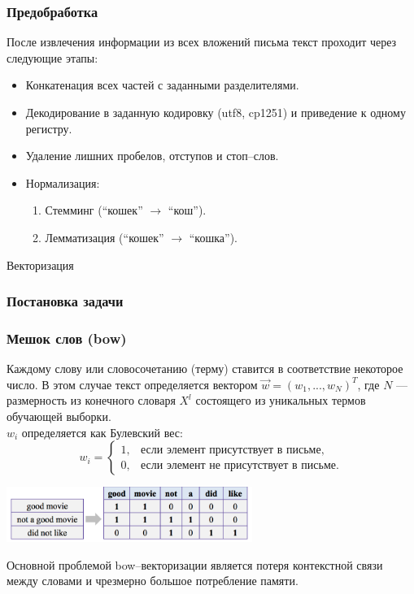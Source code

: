 \documentclass[compress,professionalfont]{beamer}
\begin{document}
\begin{frame}
\frametitle{Предобработка}

После извлечения информации из всех вложений письма текст проходит через следующие этапы:
\begin{itemize}
\item Конкатенация всех частей с заданными разделителями.
\item Декодирование в заданную кодировку (utf8, cp1251) и приведение к одному регистру.
\item Удаление лишних пробелов, отступов и стоп--слов.
\item Нормализация:
\begin{enumerate}
\item Стемминг (``кошек'' $\rightarrow$ ``кош'').
\item Лемматизация (``кошек'' $\rightarrow$ ``кошка'').
\end{enumerate}
\end{itemize}

\end{frame}

\begin{frame}

\begin{center}
Векторизация
\end{center}

\end{frame}

\begin{frame}
\frametitle{Постановка задачи}

\end{frame}

\begin{frame}
\frametitle{Мешок слов (bow)}

Каждому слову или словосочетанию (терму) ставится в соответствие некоторое число. В этом случае текст определяется вектором $\vec{w} = (w_1, ..., w_N)^T$,
где $N$ --- размерность из конечного словаря $X^l$ состоящего из уникальных термов обучающей выборки. \\
$w_i$ определяется как Булевский вес:
$$
w_i = \begin{cases}
1, & \mbox{если элемент присутствует в письме}, \\
0, & \mbox{если элемент не присутствует в письме}.
\end{cases}
$$

\begin{center}
\includegraphics[width=0.6\textwidth]{bow.png}
\end{center}

Основной проблемой bow--векторизации является потеря контекстной связи между словами и чрезмерно большое потребление памяти.

\end{frame}
\end{document}
